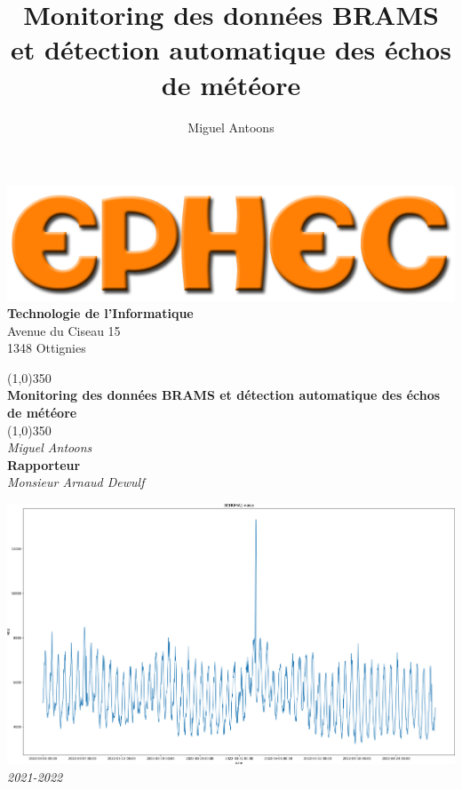 \documentclass[11pt]{article}
\title{Monitoring des données BRAMS et détection automatique des échos de météore}
\author{Miguel Antoons}
\begin{document}
\begin{titlepage}
    \begin{center}
        \includegraphics[]{logo_ephec.png}\\
        \Large
        \textbf{Technologie de l'Informatique}\\
        \large
        Avenue du Ciseau 15\\
        1348 Ottignies
    \end{center}


    \begin{center}
        \line(1,0){350}\\
        \LARGE\textbf{Monitoring des données BRAMS et détection automatique des échos de météore}\\
        \line(1,0){350}\\
        \vspace{0.5cm}
        \LARGE\textit{Miguel Antoons}\\
        \vspace{0.5cm}
        \Large\textbf{Rapporteur}\\
        \Large\textit{Monsieur Arnaud Dewulf}
    \end{center}

    \vspace{0.14cm}

    \begin{center}
        \includegraphics[scale=0.225]{page_garde.png}\\
        \vspace{0.14cm}
        \textit{2021-2022}
    \end{center}



\end{titlepage}
\end{document}
